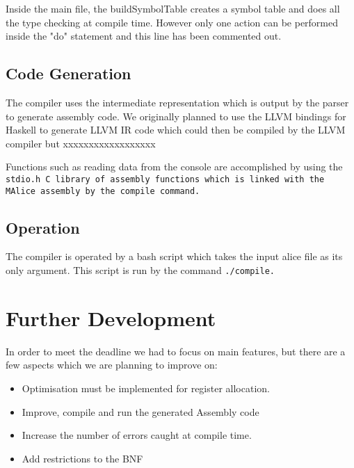 \documentclass[11pt]{article}
\begin{document}
Inside the main file, the buildSymbolTable creates a symbol table and does all the type checking at compile time. However only one action can be performed inside the "do" statement and this line has been commented out.

\subsection{Code Generation}
The compiler uses the intermediate representation which is output by the parser to generate assembly code. We originally planned to use the LLVM bindings for Haskell to generate LLVM IR code which could then be compiled by the LLVM compiler but xxxxxxxxxxxxxxxxxx

Functions such as reading data from the console are accomplished by using the \tt stdio.h \rm C library of assembly functions which is linked with the MAlice assembly by the \tt compile \rm command.

\subsection{Operation}
The compiler is operated by a bash script which takes the input alice file as its only argument. This script is run by the command \tt ./compile\rm .

\section{Further Development}
In order to meet the deadline we had to focus on main features, but there are a few aspects which we are planning to improve on:

\begin{itemize}
\item Optimisation must be implemented for register allocation.
\item Improve, compile and run the generated Assembly code
\item Increase the number of errors caught at compile time.
\item Add restrictions to the BNF
\end{itemize}
\end{document}
